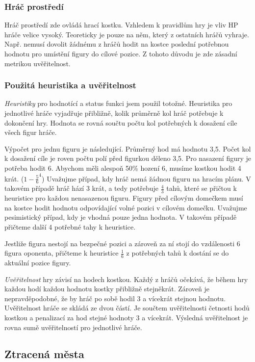 \subsubsection{Hráč prostředí}

Hráč prostředí zde ovládá hrací kostku. Vzhledem k pravidlům hry je vliv HP hráče velice vysoký. Teoreticky je pouze na něm, který z ostatních hráčů vyhraje. Např. nemusí dovolit žádnému z hráčů hodit na kostce poslední potřebnou hodnotu pro umístění figury do cílové pozice. Z tohoto důvodu je zde zásadní metrikou uvěřitelnost.

\subsubsection{Použitá heuristika a uvěřitelnost}

\emph{Heuristiky} pro hodnotící a status funkci jsem použil totožné. Heuristika pro jednotlivé hráče vyjadřuje přibližně, kolik průměrně kol hráč potřebuje k dokončení hry. Hodnota se rovná součtu počtu kol potřebných k dosažení cíle všech figur hráče. 

Výpočet pro jednu figuru je následující. Průměrný hod má hodnotu 3,5. Počet kol k dosažení cíle je roven počtu polí před figurkou děleno 3,5. Pro nasazení figury je potřeba hodit 6. Abychom měli alespoň 50\% hození 6, musíme kostkou hodit 4 krát. ($1-\frac{5}{6}^4$) Uvažujme případ, kdy hráč nemá žádnou figuru na hracím plánu. V takovém případě hráč hází 3 krát, a tedy potřebuje $\frac{4}{3}$ tahů, které se přičtou k heuristice pro každou nenasazenou figuru. Figury před cílovým domečkem musí na kostce hodit hodnotu odpovídající volné pozici v cílovém domečku. Uvažujme pesimistický případ, kdy je vhodná pouze jedna hodnota. V takovém případě přičteme další 4 potřebné tahy k heuristice.

Jestliže figura nestojí na bezpečné pozici a zároveň za ní stojí do vzdálenosti 6 figura oponenta, přičteme k heuristice $\frac{1}{6}$ z potřebných tahů k dostání se do aktuální pozice figury.

\emph{Uvěřitelnost} hry závisí na hodech kostkou. Každý z hráčů očekává, že během hry každou hodí každou hodnotu kostky přibližně stejněkrát. Zároveň je nepravděpodobné, že by hráč po sobě hodil 3 a vícekrát stejnou hodnotu. Uvěřitelnost hráče se skládá ze dvou částí. Je součtem uvěřitelnosti četnosti hodů kostkou a penalizací za hod stejné hodnoty 3 a vícekrát. Výsledná uvěřitelnost je rovna sumě uvěřitelností pro jednotlivé hráče.

\subsection{Ztracená města}

